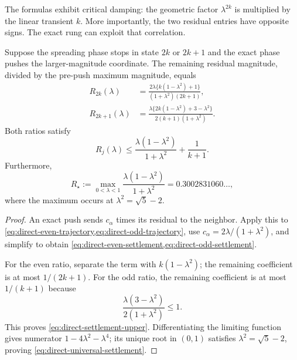 The formulas exhibit critical damping: the geometric factor
$\lambda^{2k}$ is multiplied by the linear transient $k$. More importantly,
the two residual entries have opposite signs. The exact rung can exploit
that correlation.

\begin{lemma}
\label{lem:direct-edge-settlement-ratio}
Suppose the spreading phase stops in state $2k$ or $2k+1$ and the exact phase
pushes the larger-magnitude coordinate. The remaining residual magnitude,
divided by the pre-push maximum magnitude, equals
\begin{align}
 R_{2k}(\lambda)
 &=\frac{2\lambda\{k(1-\lambda^2)+1\}}
         {(1+\lambda^2)(2k+1)},
 \label{eq:direct-even-settlement}\\
 R_{2k+1}(\lambda)
 &=\frac{\lambda\{2k(1-\lambda^2)+3-\lambda^2\}}
         {2(k+1)(1+\lambda^2)}.
 \label{eq:direct-odd-settlement}
\end{align}
Both ratios satisfy
\begin{equation}
 R_j(\lambda)
 \leq
 \frac{\lambda(1-\lambda^2)}{1+\lambda^2}
 +\frac1{k+1}.
 \label{eq:direct-settlement-upper}
\end{equation}
Furthermore,
\begin{equation}
 R_\star
 :=\max_{0<\lambda<1}
   \frac{\lambda(1-\lambda^2)}{1+\lambda^2}
 =0.3002831060\ldots,
 \label{eq:direct-universal-settlement}
\end{equation}
where the maximum occurs at
$\lambda^2=\sqrt5-2$.
\end{lemma}

\begin{proof}
An exact push sends $c_\alpha$ times its residual to the neighbor. Apply this
to \cref{eq:direct-even-trajectory,eq:direct-odd-trajectory}, use
$c_\alpha=2\lambda/(1+\lambda^2)$, and simplify to obtain
\cref{eq:direct-even-settlement,eq:direct-odd-settlement}.

For the even ratio, separate the term with $k(1-\lambda^2)$; the remaining
coefficient is at most $1/(2k+1)$. For the odd ratio, the remaining
coefficient is at most $1/(k+1)$ because
\begin{equation*}
 \frac{\lambda(3-\lambda^2)}{2(1+\lambda^2)}\leq1.
\end{equation*}
This proves \cref{eq:direct-settlement-upper}. Differentiating the limiting
function gives numerator
$1-4\lambda^2-\lambda^4$; its unique root in $(0,1)$ satisfies
$\lambda^2=\sqrt5-2$, proving \cref{eq:direct-universal-settlement}.
\end{proof}

